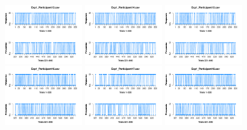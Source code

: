 \begin{figure}[th]
\includegraphics[width=0.30\textwidth]{Figures/Response_Exp1_P13} \includegraphics[width=0.30\textwidth]{Figures/Response_Exp1_P14} \includegraphics[width=0.30\textwidth]{Figures/Response_Exp1_P15}
\includegraphics[width=0.30\textwidth]{Figures/Response_Exp1_P16} \includegraphics[width=0.30\textwidth]{Figures/Response_Exp1_P17} \includegraphics[width=0.30\textwidth]{Figures/Response_Exp1_P18}

\end{figure}
